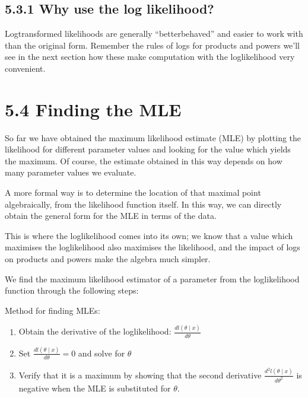 \documentclass[letterpaper,10pt,english]{jupyterBook}
\begin{document}
\subsection{5.3.1 Why use the log likelihood?}
\label{\detokenize{05.d. Likelihood:why-use-the-log-likelihood}}
\sphinxAtStartPar
Log\sphinxhyphen{}transformed likelihoods are generally “better\sphinxhyphen{}behaved” and easier to work with than the original form. Remember the rules of logs for products and powers \sphinxhyphen{} we’ll see in the next section how these make computation with the log\sphinxhyphen{}likelihood very convenient.


\section{5.4 Finding the MLE}
\label{\detokenize{05.e. Likelihood:finding-the-mle}}\label{\detokenize{05.e. Likelihood::doc}}
\sphinxAtStartPar
So far we have obtained the maximum likelihood estimate (MLE) by plotting the likelihood for different parameter values and looking for the value which yields the maximum. Of course, the estimate obtained in this way depends on how many parameter values we evaluate.

\sphinxAtStartPar
A more formal way is to determine the location of that maximal point algebraically, from the likelihood function itself. In this way, we can directly obtain the general form for the MLE in terms of the data.

\sphinxAtStartPar
This is where the log\sphinxhyphen{}likelihood comes into its own; we know that a value which maximises the log\sphinxhyphen{}likelihood also maximises the likelihood, and the impact of logs on products and powers make the algebra much simpler.

\sphinxAtStartPar
We find the maximum likelihood estimator of a parameter from the log\sphinxhyphen{}likelihood function through the following steps:



\sphinxAtStartPar
 Method for finding MLEs:
\begin{enumerate}
%
\item {} 
\sphinxAtStartPar
Obtain the derivative of the log\sphinxhyphen{}likelihood: \(\frac{d l(\theta \mid {x})}{d \theta}\)

\item {} 
\sphinxAtStartPar
Set \(\frac{d l(\theta \mid {x})}{d \theta}=0\) and solve for \(\theta\)

\item {} 
\sphinxAtStartPar
Verify that it is a maximum by showing that the second derivative \(\frac{d ^2 l(\theta \mid  {x})}{d \theta ^2 }\) is negative when the MLE is substituted for \(\theta\).

\end{enumerate}
\end{document}
